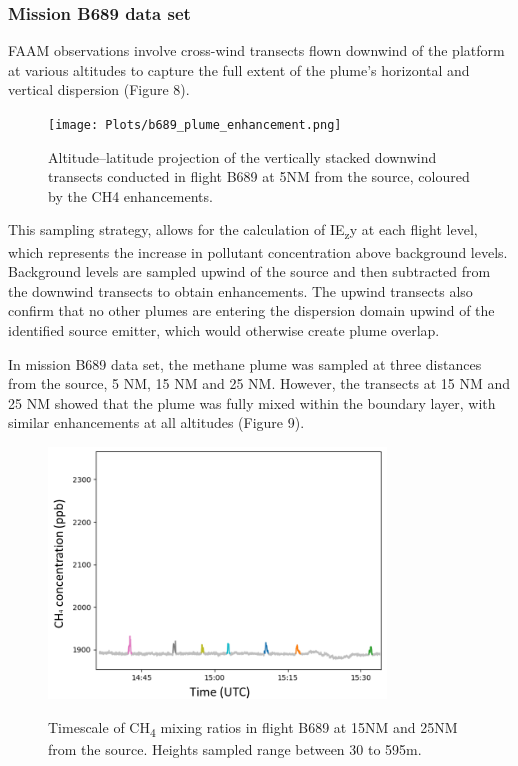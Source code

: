 \documentclass[12pt]{article}
\begin{document}
\subsubsection{Mission B689 data set}

FAAM observations involve cross-wind transects flown downwind of the platform at various altitudes to capture the full extent of the plume's horizontal and vertical dispersion (Figure 8).
\begin{figure}[H]
\centering
\texttt{[image: Plots/b689\_plume\_enhancement.png]}
\caption{\label{fig:volume source}} Altitude–latitude projection of the vertically stacked
downwind transects conducted in flight B689 at 5NM from the source, coloured by the CH4 enhancements.  
\end{figure}

This sampling strategy, allows for the calculation of IE\textsubscript{z}y at each flight level, which  represents the increase in pollutant concentration above background levels. Background levels are sampled upwind of the source and then subtracted from the downwind transects to obtain enhancements.  The upwind transects also confirm that no other plumes are entering the dispersion domain upwind of the identified source emitter, which would otherwise create plume overlap. 

In mission B689 data set, the methane plume was sampled at three distances from the source, 5 NM, 15 NM and 25 NM. However, the transects at 15 NM and 25 NM showed that the plume was fully mixed within the boundary layer, with similar enhancements at all altitudes  (Figure 9).

\begin{figure}[H]
\centering
\includegraphics[width=0.8\textwidth]{Plots/peak_id_mixed_plume.png}
\caption{\label{fig:volume source}} Timescale  of CH\textsubscript{4} mixing ratios in  flight B689 at 15NM and 25NM from the source. Heights sampled range between 30 to 595m.  
\end{figure}
\end{document}
